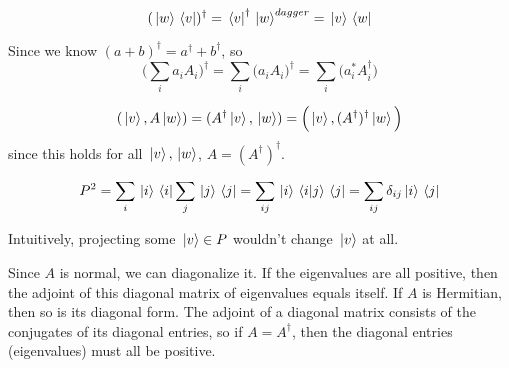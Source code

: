 \exercise
$$(\ket*{w} \bra*{v})^{\dagger} = \bra*{v}^{\dagger} \ket*{w}^{dagger} = \ket*{v} \bra*{w}$$

\exercise
Since we know $(a + b)^{\dagger} = a^{\dagger} + b^{\dagger}$, so $$\Big( \sum_{i} a_{i} A_{i} \Big)^{\dagger} = \sum_{i} \Big( a_{i} A_{i} \Big)^{\dagger} = \sum_{i} \Big( a_{i}^{*} A_{i}^{\dagger} \Big)$$

\exercise
$$(\ket*{v}, A\ket*{w}) = (A^{\dagger} \ket*{v}, \ket*{w}) = \Big(\ket*{v}, (A^{\dagger})^{\dagger} \ket*{w} \Big)$$
since this holds for all $\ket*{v}, \ket*{w}$, $A = (A^{\dagger})^{\dagger}$. 

\exercise
$$P^{2} = \sum_{i} \ket*{i} \bra*{i} \sum_{j} \ket*{j} \bra*{j} = \sum_{ij} \ket*{i} \braket*{i}{j} \bra*{j} = \sum_{ij} \delta_{ij} \ket*{i} \bra*{j}$$

Intuitively, projecting some $\ket*{v} \in P $ wouldn't change $\ket*{v}$ at all. 

\exercise
Since $A$ is normal, we can diagonalize it. If the eigenvalues are all positive, then the adjoint of this diagonal matrix of eigenvalues equals itself. If $A$ is Hermitian, then so is its diagonal form. The adjoint of a diagonal matrix consists of the conjugates of its diagonal entries, so if $A = A^{\dagger}$, then the diagonal entries (eigenvalues) must all be positive. 
